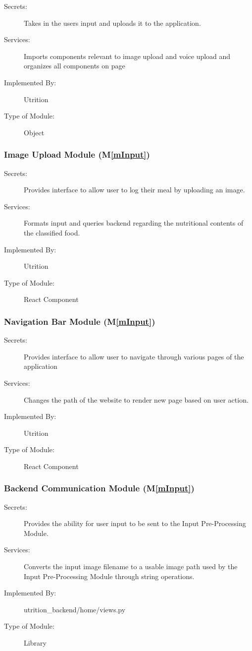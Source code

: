 \documentclass[12pt, titlepage]{article}
\newcommand{\mref}[1]{M\ref{#1}}
\begin{document}
\begin{description}
\item[Secrets:]Takes in the users input and uploads it to the application.
\item[Services:] Imports components relevant to image upload and voice upload and organizes all components on page 
\item[Implemented By:] Utrition
\item[Type of Module:] Object
\end{description}

\subsubsection{Image Upload Module (\mref{mInput})}

\begin{description}
	\item[Secrets:]Provides interface to allow user to log their meal by 
	uploading an image.
	\item[Services:]Formats input and queries backend regarding the nutritional 
	contents of the classified food.
	\item[Implemented By:] Utrition
	\item[Type of Module:] React Component
\end{description}
\subsubsection{Navigation Bar Module (\mref{mInput})}

\begin{description}
	\item[Secrets:]Provides interface to allow user to navigate through various 
	pages of the application
	\item[Services:]Changes the path of the website to render new page based on 
	user action.
	\item[Implemented By:] Utrition
	\item[Type of Module:] React Component
\end{description}

\subsubsection{Backend Communication Module (\mref{mInput})}

\begin{description}
	\item[Secrets:] Provides the ability for user input to be sent to the Input 
	Pre-Processing Module.
	\item[Services:]Converts the input image filename to a usable image path 
	used by the Input Pre-Processing Module through string operations.
	\item[Implemented By:] utrition\_backend/home/views.py
 	\item[Type of Module:] Library
\end{description}
\end{document}
